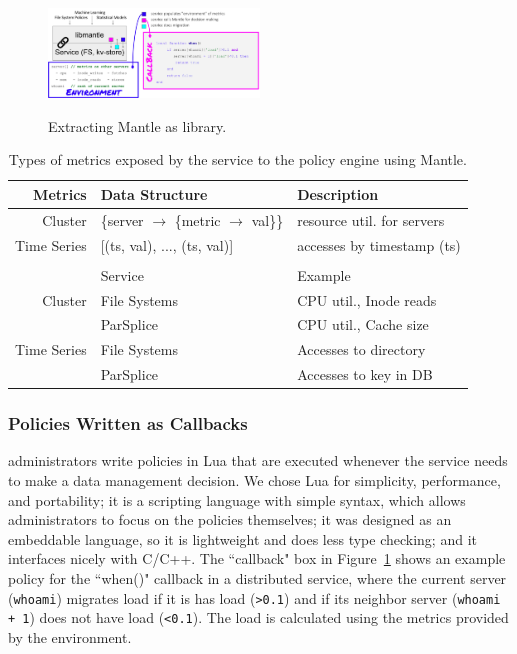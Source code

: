 \begin{figure}[t]
  \noindent\includegraphics[width=0.5\textwidth]{figures/mantle.png}\\

  \caption{Extracting Mantle as library.\label{fig:mantle}}

\end{figure}

\begin{table}
  \centering
  \begin{tabular}{ r | l | l }
  Metrics     & Data Structure & Description \\\hline
  Cluster     & \{server \(\rightarrow\) \{metric \(\rightarrow\) val\}\}
              & resource util. for servers \\
  Time Series & [(ts, val), ..., (ts, val)]
              & accesses by timestamp (ts) \\
  && \\
              & Service      & Example \\\hline
  Cluster     & File Systems & CPU util., Inode reads \\
              & ParSplice    & CPU util., Cache size \\
  Time Series & File Systems & Accesses to directory \\
              & ParSplice    & Accesses to key in DB\\
  \end{tabular}
  \caption{Types of metrics exposed by the service to the policy engine using Mantle.\label{table:metrics}}
\end{table}

\subsubsection{Policies Written as Callbacks} administrators write policies in
Lua that are executed whenever the service needs to make a data management
decision. We chose Lua for simplicity, performance, and portability; it is a
scripting language with simple syntax, which allows administrators to focus on
the policies themselves; it was designed as an embeddable language, so it is
lightweight and does less type checking; and it interfaces nicely with C/C++.
The ``callback" box in Figure~\ref{fig:mantle} shows an example policy for the
``when()" callback in a distributed service, where the current server
(\texttt{whoami}) migrates load if it is has load (\texttt{>0.1}) and if its
neighbor server (\texttt{whoami + 1}) does not have load (\texttt{<0.1}). The
load is calculated using the metrics provided by the environment.


